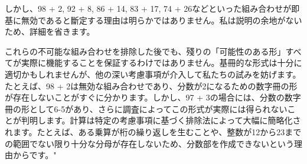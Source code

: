\documentclass[10pt,a4paper,oneside,openany]{ltjsbook}
\begin{document}
\begin{tcolorbox}[colback=softblue,colframe=primaryblue,title=\textbf{第 90 問：THE CENTURY PUZZLE.},arc=2mm,boxrule=1pt,breakable]
{しかし、98 + 2, 92 + 8, 86 + 14, 83 + 17, 74 + 26などといった組み合わせが即基に無効であると斷定する理由は明らかではありません。私は説明の余地がないため、詳細を省きます。

これらの不可能な組み合わせを排除した後でも、殘りの「可能性のある形」すべてが実際に機能することを保証するわけではありません。基冊的な形式は十分に適切かもしれませんが、他の深い考慮事項が介入して私たちの試みを妨げます。たとえば、98 + 2は無効な組み合わせであり、分数が2になるための数字冊の形が存在しないことがすぐに分かります。しかし、97 + 3の場合には、分数の数字冊の形として6-5があり、さらに調査によってこの形式が実際には得られないことが判明します。計算は特定の考慮事項に基づく排除法によって大幅に簡略化されます。たとえば、ある乗算が桁の繰り返しを生むことや、整数が12から23までの範囲でない限り十分な分母が存在しないため、分数部を作成できないという理由からです。"
}
\end{tcolorbox}
\end{document}
